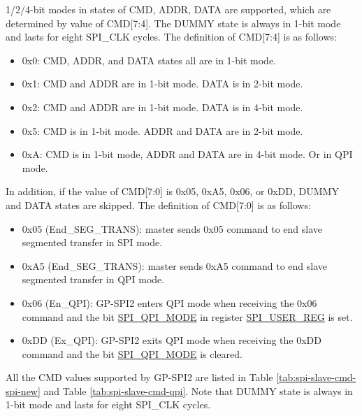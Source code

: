 \documentclass[main\_\_EN.tex]{subfiles}
\begin{document}
1/2/4-bit modes in states of CMD, ADDR, DATA are supported, which are determined by value of CMD[7:4]. The DUMMY state is always in 1-bit mode and lasts for eight SPI\_CLK cycles. The definition of CMD[7:4] is as follows:

\begin{itemize}
    \item 0x0: CMD, ADDR, and DATA states all are in 1-bit mode.
    \item 0x1: CMD and ADDR are in 1-bit mode. DATA is in 2-bit mode.
    \item 0x2: CMD and ADDR are in 1-bit mode. DATA is in 4-bit mode.
    \item 0x5: CMD is in 1-bit mode. ADDR and DATA are in 2-bit mode.
    \item 0xA: CMD is in 1-bit mode, ADDR and DATA are in 4-bit mode. Or in QPI mode.
\end{itemize}

In addition, if the value of CMD[7:0] is 0x05, 0xA5, 0x06, or 0xDD, DUMMY and DATA states are skipped. The definition of CMD[7:0] is as follows:

\begin{itemize}
    \item \label{cmd:ENDSEGTRANS}0x05 (End\_SEG\_TRANS): master sends 0x05 command to end slave segmented transfer in SPI mode.
    \item 0xA5 (End\_SEG\_TRANS): master sends 0xA5 command to end slave segmented transfer in QPI mode.
    \item 0x06 (En\_QPI): GP-SPI2 enters QPI mode when receiving the 0x06 command and the bit \hyperref[fielddesc:SPIQPIMODE]{SPI\_QPI\_MODE} in register \hyperref[regdesc:SPIUSERREG]{SPI\_USER\_REG} is set.
    \item 0xDD (Ex\_QPI): GP-SPI2 exits QPI mode when receiving the 0xDD command and the bit \hyperref[fielddesc:SPIQPIMODE]{SPI\_QPI\_MODE} is cleared.
\end{itemize}


All the CMD values supported by GP-SPI2 are listed in Table \ref{tab:spi-slave-cmd-spi-new} and Table \ref{tab:spi-slave-cmd-qpi}. Note that DUMMY state is always in 1-bit mode and lasts for eight SPI\_CLK cycles.
\end{document}

